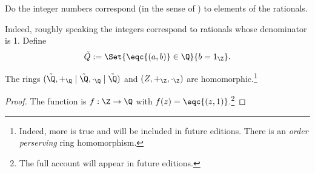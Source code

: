 

Do the integer numbers correspond (in the sense of ) to elements of the rationals.


Indeed, roughly speaking the integers correspond to rationals whose denominator is 1.
Define
\[
  \tilde{Q} := \Set{\eqc{(a, b)} \in \Q}{b = 1_{\Z}}.
\]

\begin{proposition}
  The rings $(\tilde{\Q}, +_{\Q} \mid \tilde{\Q}, \cdot_{\Q} \mid \tilde{\Q})$ and $(Z, +_{\Z}, \cdot_{\Z})$ are homomorphic.\footnote{Indeed, more is true and will be included in future editions. There is an \textit{order perserving} ring homomorphism.}
\end{proposition}
\begin{proof}
  The function is $f: \Z \to \Q$ with $f(z) = \eqc{(z, 1)}$.\footnote{The full account will appear in future editions.}
\end{proof}

\blankpage
